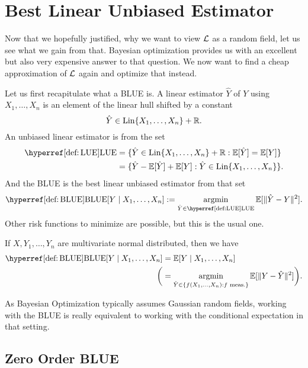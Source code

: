\section{Best Linear Unbiased Estimator}

Now that we hopefully justified, why we want to view \(\mathcal{L}\) as a random field,
let us see what we gain from that. Bayesian optimization provides us with
an excellent but also very expensive answer to that question. We now want to
find a cheap approximation of \(\mathcal{L}\) again and optimize that instead.

Let us first recapitulate what a BLUE is. A linear estimator \(\hat{Y}\) of
\(Y\) using \(X_1,\dots,X_n\) is an element of the linear hull shifted by a
constant 
\begin{equation*}
	\hat{Y}\in \operatorname{Lin}\{X_1,\dots,X_n\} + \mathbb{R}.
\end{equation*}
An unbiased linear estimator is from the set
\begin{align}\label{def: LUE}
	\LUE
	&= \{ \hat{Y} \in \linHull\{X_1,\dots,X_n\} + \real : \E[\hat{Y}] = \E[Y]\}\\
	\nonumber
	&= \{ \hat{Y} - \E[\hat{Y}] + \E[Y] : \hat{Y} \in \linHull\{X_1,\dots,X_n\}\}.
\end{align}
And the BLUE is the best linear unbiased estimator from that set
\begin{equation}\label{def: BLUE}
	\BLUE[Y\mid X_1,\dots, X_n] := \argmin_{\hat{Y}\in\LUE} \E[\|\hat{Y} - Y\|^2].
\end{equation}
Other risk functions to minimize are possible, but this is the usual one.
\begin{lemma}\label{lem: blue is cond. expectation}
	If \(X,Y_1,\dots, Y_n\) are multivariate normal distributed, then we
	have
	\begin{align*}
		\BLUE[Y\mid X_1,\dots,X_n]
		&= \E[Y\mid X_1,\dots, X_n]\\
		\bigg(&=
		\argmin_{\hat{Y}\in\{f(X_1,\dots, X_n) : f\text{ meas.}\}} \E[\|Y-\hat{Y}\|^2]
		\bigg).
	\end{align*}
\end{lemma}
\begin{remark}
	As Bayesian Optimization typically assumes Gaussian random fields, working with
	the BLUE is really equivalent to working with the conditional expectation in
	that setting.
\end{remark}

\subsection{Zero Order BLUE}

